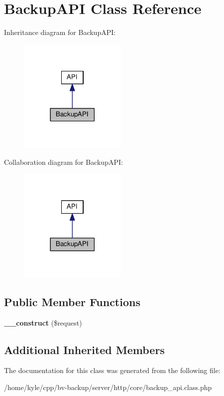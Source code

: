 \hypertarget{class_backup_a_p_i}{}\section{Backup\+A\+PI Class Reference}
\label{class_backup_a_p_i}


Inheritance diagram for Backup\+A\+PI\+:
\nopagebreak
\begin{figure}[H]
\begin{center}
\leavevmode
\includegraphics[width=146pt]{class_backup_a_p_i__inherit__graph}
\end{center}
\end{figure}


Collaboration diagram for Backup\+A\+PI\+:
\nopagebreak
\begin{figure}[H]
\begin{center}
\leavevmode
\includegraphics[width=146pt]{class_backup_a_p_i__coll__graph}
\end{center}
\end{figure}
\subsection*{Public Member Functions}
\begin{DoxyCompactItemize}
\item 
\mbox{\label{class_backup_a_p_i_a4dcf5108de16dd3731ca7d455a436110}} 
{\bfseries \+\_\+\+\_\+construct} (\$request)
\end{DoxyCompactItemize}
\subsection*{Additional Inherited Members}


The documentation for this class was generated from the following file\+:\begin{DoxyCompactItemize}
\item 
/home/kyle/cpp/bv-\/backup/server/http/core/backup\+\_\+api.\+class.\+php\end{DoxyCompactItemize}
